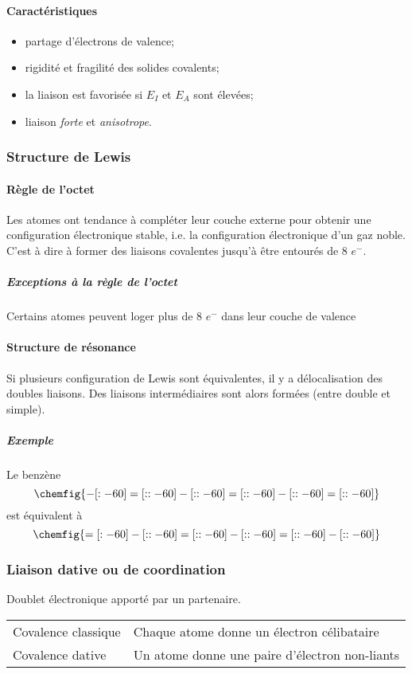 \paragraph{Caractéristiques}
\begin{itemize}
	\item partage d'électrons de valence;
	\item rigidité et fragilité des solides covalents;
	\item la liaison est favorisée si $E_I$ et $E_A$ sont élevées;
	\item liaison \emph{forte} et \emph{anisotrope}.
\end{itemize}
\subsubsection{Structure de Lewis}
\paragraph{Règle de l'octet}
Les atomes ont tendance à compléter leur couche externe pour obtenir une configuration électronique stable, i.e. la configuration électronique d'un gaz noble.
C'est à dire à former des liaisons covalentes jusqu'à être entourés de 8 $e^-$.
\subparagraph{Exceptions à la règle de l'octet}
Certains atomes peuvent loger plus de 8 $e^-$ dans leur couche de valence

\paragraph{Structure de résonance}
Si plusieurs configuration de Lewis sont équivalentes, il y a délocalisation des doubles liaisons.
Des liaisons intermédiaires sont alors formées (entre double et simple).
\subparagraph{Exemple} Le benzène
$$\chemfig{-[:-60]=[::-60]-[::-60]=[::-60]-[::-60]=[::-60]}$$ est équivalent à $$\chemfig{=[:-60]-[::-60]=[::-60]-[::-60]=[::-60]-[::-60]}$$

\subsubsection{Liaison dative ou de coordination}
Doublet électronique apporté par un partenaire.

\begin{center}
	\begin{tabular}{ll}
		Covalence classique & Chaque atome donne un électron célibataire\\
		Covalence dative & Un atome donne une paire d'électron non-liants
	\end{tabular}
\end{center}

